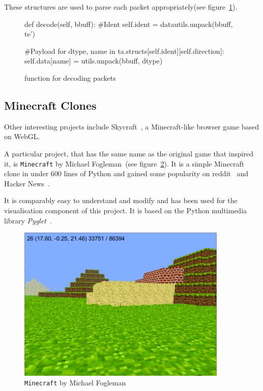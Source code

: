 These structures are used to parse each packet appropriately(see figure~\ref{snippet_parse}).

		\begin{figure}[ht]
			\centering
			\begin{minipage}{13cm}
				\begin{pseudocode}
def decode(self, bbuff):
	#Ident
	self.ident = datautils.unpack(bbuff, te')
	
	#Payload
	for dtype, name in ta.structs[self.ident][self.direction]:
		self.data[name] = utils.unpack(bbuff, dtype)
					\end{pseudocode}
				\caption{function for decoding packets}
				\label{snippet_parse}
			\end{minipage}
		\end{figure}
		
		\subsection{Minecraft Clones}
Other interesting projects include Skycraft~\cite{skycraft}, a Minecraft-like browser game based on WebGL.

A particular project, that has the same name as the original game that inspired it, is \texttt{Minecraft} by Michael Fogleman~(see figure~\ref{fogleman_mc_screen}). It is a simple Minecraft clone in under 600 lines of Python and gained some popularity on reddit~\cite{fogle-reddit} and Hacker News~\cite{fogle_hn}.

It is comparably easy to understand and modify and has been used for the visualisation component of this project. It is based on the Python multimedia library \emph{Pyglet}~\cite{pyglet}.

\begin{figure}[h]
  \centering
    \includegraphics[width=10cm]{graphics/fogleman_mc_screen}
  \caption{\texttt{Minecraft} by Michael Fogleman}
  \label{fogleman_mc_screen}
\end{figure}


